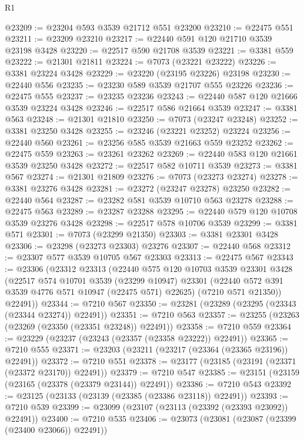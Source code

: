 \begin{lexlean}{R1}
\begin{coremodule}
@23209 := @23204 @593 @3539 @21712 @551 @23200
@23210 := @22475 @551
@23211 := @23209 @23210
@23217 := @22440 @591 @120 @21710 @3539 @23198 @3428
@23220 := @22517 @590 @21708 @3539
@23221 := @3381 @559
@23222 := @21301 @21811
@23224 := @7073 (@23221 @23222)
@23226 := @3381 @23224 @3428
@23229 := @23220 (@23195 @23226) @23198
@23230 := @22440 @556
@23235 := @23230 @589 @3539 @21707 @555 @23226
@23236 := @22475 @555
@23237 := @23235 @23236
@23243 := @22440 @587 @120 @21666 @3539 @23224 @3428
@23246 := @22517 @586 @21664 @3539
@23247 := @3381 @563
@23248 := @21301 @21810
@23250 := @7073 (@23247 @23248)
@23252 := @3381 @23250 @3428
@23255 := @23246 (@23221 @23252) @23224
@23256 := @22440 @560
@23261 := @23256 @585 @3539 @21663 @559 @23252
@23262 := @22475 @559
@23263 := @23261 @23262
@23269 := @22440 @583 @120 @21661 @3539 @23250 @3428
@23272 := @22517 @582 @10711 @3539
@23273 := @3381 @567
@23274 := @21301 @21809
@23276 := @7073 (@23273 @23274)
@23278 := @3381 @23276 @3428
@23281 := @23272 (@23247 @23278) @23250
@23282 := @22440 @564
@23287 := @23282 @581 @3539 @10710 @563 @23278
@23288 := @22475 @563
@23289 := @23287 @23288
@23295 := @22440 @579 @120 @10708 @3539 @23276 @3428
@23298 := @22517 @578 @10706 @3539
@23299 := @3381 @571
@23301 := @7073 (@23299 @21350)
@23303 := @3381 @23301 @3428
@23306 := @23298 (@23273 @23303) @23276
@23307 := @22440 @568
@23312 := @23307 @577 @3539 @10705 @567 @23303
@23313 := @22475 @567
@23343 := @23306
    (@23312
      @23313
      (@22440
        @575
        @120
        @10703
        @3539
        @23301
        @3428
        (@22517
          @574
          @10701
          @3539
          (@23299 @10947)
          @23301
          (@22440 @572 @391 @3539 @4776 @571 @10947 (@22475 @571) @22625)
          (@7210 @571 @21350))
        @22491))
@23344 := @7210 @567
@23350 := @23281 (@23289 (@23295 (@23343 (@23344 @23274)) @22491))
@23351 := @7210 @563
@23357 := @23255 (@23263 (@23269 (@23350 (@23351 @23248)) @22491))
@23358 := @7210 @559
@23364 := @23229 (@23237 (@23243 (@23357 (@23358 @23222)) @22491))
@23365 := @7210 @555
@23371 := @23203 (@23211 (@23217 (@23364 (@23365 @23196)) @22491))
@23372 := @7210 @551
@23378 := @23177 (@23185 (@23191 (@23371 (@23372 @23170)) @22491))
@23379 := @7210 @547
@23385 := @23151 (@23159 (@23165 (@23378 (@23379 @23144)) @22491))
@23386 := @7210 @543
@23392 := @23125 (@23133 (@23139 (@23385 (@23386 @23118)) @22491))
@23393 := @7210 @539
@23399 := @23099 (@23107 (@23113 (@23392 (@23393 @23092)) @22491))
@23400 := @7210 @535
@23406 := @23073 (@23081 (@23087 (@23399 (@23400 @23066)) @22491))

\end{coremodule}
\end{lexlean}
